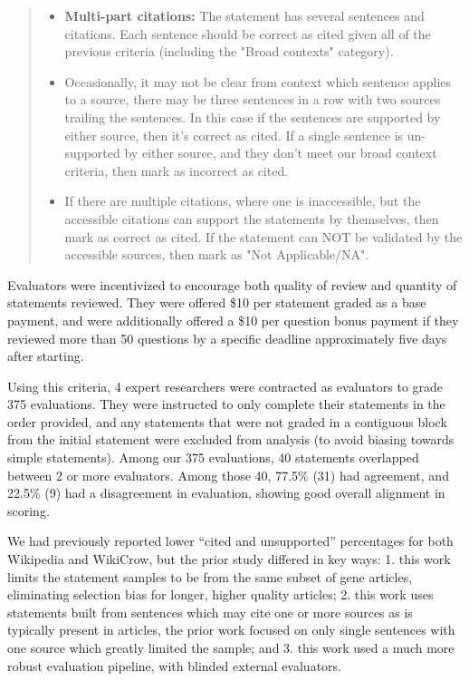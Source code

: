 \begin{quote}
\begin{itemize}
\item{\textbf{Multi-part citations:} The statement has several sentences and citations. Each sentence should be correct as cited given all of the previous criteria (including the "Broad contexts" category).}

\item{Occasionally, it may not be clear from context which sentence applies to a source, there may be three sentences in a row with two sources trailing the sentences. In this case if the sentences are supported by either source, then it's correct as cited. If a single sentence is un-supported by either source, and they don't meet our broad context criteria, then mark as incorrect as cited.}

\item{If there are multiple citations, where one is inaccessible, but the accessible citations can support the statements by themselves, then mark as correct as cited. If the statement can NOT be validated by the accessible sources, then mark as "Not Applicable/NA".}
\end{itemize}
\end{quote}

Evaluators were incentivized to encourage both quality of review and quantity of statements reviewed. They were offered \$10 per statement graded as a base payment, and were additionally offered a \$10 per question bonus payment if they reviewed more than 50 questions by a specific deadline approximately five days after starting.

Using this criteria, 4 expert researchers were contracted as evaluators to grade 375 evaluations. They were instructed to only complete their statements in the order provided, and any statements that were not graded in a contiguous block from the initial statement were excluded from analysis (to avoid biasing towards simple statements). Among our 375 evaluations, 40 statements overlapped between 2 or more evaluators. Among those 40, 77.5\% (31) had agreement, and 22.5\% (9) had a disagreement in evaluation, showing good overall alignment in scoring. 

We had previously reported\cite{coxWikiCrow} lower ``cited and unsupported'' percentages for both Wikipedia and WikiCrow, but the prior study differed in key ways: 1. this work limits the statement samples to be from the same subset of gene articles, eliminating selection bias for longer, higher quality articles; 2. this work uses statements built from sentences which may cite one or more sources as is typically present in articles, the prior work focused on only single sentences with one source which greatly limited the sample; and 3. this work used a much more robust evaluation pipeline, with blinded external evaluators.

